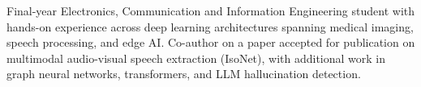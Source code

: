 

\begin{cvparagraph}

Final-year Electronics, Communication and Information Engineering student with hands-on experience across deep learning architectures spanning medical imaging, speech processing, and edge AI. Co-author on a paper accepted for publication on multimodal audio-visual speech extraction (IsoNet), with additional work in graph neural networks, transformers, and LLM hallucination detection.
\end{cvparagraph}
